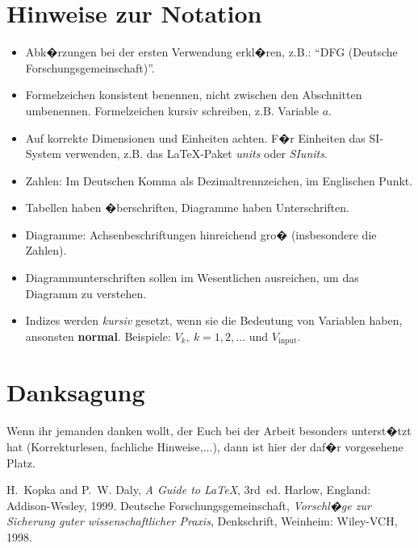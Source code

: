\documentclass[journal,final,a4paper,twoside]{PS}
\begin{document}
\section{Hinweise zur Notation}
\label{sec:notation}
\begin{itemize}
 \item Abk�rzungen bei der ersten Verwendung erkl�ren, z.B.: ``DFG (Deutsche Forschungsgemeinschaft)''.
 \item Formelzeichen konsistent benennen, nicht zwischen den Abschnitten umbenennen. Formelzeichen kursiv schreiben, z.B. Variable $a$.
 \item Auf korrekte Dimensionen und Einheiten achten. F�r Einheiten das SI-System verwenden, z.B. das LaTeX-Paket \emph{units} oder \emph{SIunits}.
 \item Zahlen: Im Deutschen Komma als Dezimaltrennzeichen, im Englischen Punkt.
 \item Tabellen haben �berschriften, Diagramme haben Unterschriften.
 \item Diagramme: Achsenbeschriftungen hinreichend gro� (insbesondere die Zahlen).
 \item Diagrammunterschriften sollen im Wesentlichen ausreichen, um das Diagramm zu verstehen.
 \item Indizes werden \emph{kursiv} gesetzt, wenn sie die Bedeutung von Variablen haben, ansonsten \textbf{normal}. Beispiele: $V_k, \ k=1,2,\ldots$ und $V_\mathrm{input}$.
\end{itemize}




\section*{Danksagung}
Wenn ihr jemanden danken wollt, der Euch bei der Arbeit besonders
unterst�tzt hat (Korrekturlesen, fachliche Hinweise,...), dann ist hier der daf�r vorgesehene Platz.

\begin{thebibliography}{1}
H.~Kopka and P.~W. Daly, \emph{A Guide to {\LaTeX}}, 3rd~ed. Harlow, England: Addison-Wesley, 1999.
Deutsche Forschungsgemeinschaft, \emph{Vorschl�ge zur Sicherung guter wissenschaftlicher Praxis}, Denkschrift, Weinheim: Wiley-VCH, 1998.
\end{thebibliography}
\end{document}
